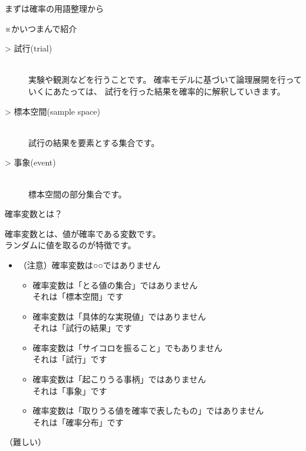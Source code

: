 \documentclass[dvipdfmx,cjk]{beamer}
\begin{document}
\begin{frame}{まずは確率の用語整理から}

※かいつまんで紹介\pause

\vskip 1cm

\begin{description}

    \item[> 試行(trial)]\mbox{}\\
            実験や観測などを行うことです。
            確率モデルに基づいて論理展開を行っていくにあたっては、
            試行を行った結果を確率的に解釈していきます。\pause

    \item[> 標本空間(sample space)]\mbox{}\\
            試行の結果を要素とする集合です。\pause

    \item[> 事象(event)]\mbox{}\\
            標本空間の部分集合です。

\end{description}

\end{frame}


\begin{frame}{確率変数とは？}\pause

確率変数とは、値が確率である変数です。\\
ランダムに値を取るのが特徴です。\pause

\vskip 0.3cm

\begin{itemize}

    \item （注意）確率変数は○○ではありません \pause
        \begin{itemize}
        \item 確率変数は「とる値の集合」ではありません\\ \pause
                それは「標本空間」です \pause
        \item 確率変数は「具体的な実現値」ではありません\\ \pause
                それは「試行の結果」です \pause
        \item 確率変数は「サイコロを振ること」でもありません\\ \pause
                それは「試行」です \pause
        \item 確率変数は「起こりうる事柄」ではありません\\ \pause
                それは「事象」です \pause
        \item 確率変数は「取りうる値を確率で表したもの」ではありません\\ \pause
                それは「確率分布」です \pause
        \end{itemize}
\end{itemize}

\vskip 1cm

（難しい）

\end{frame}
\end{document}

